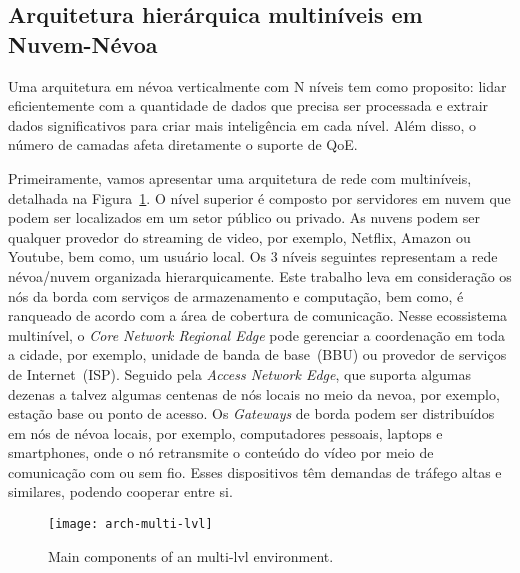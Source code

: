 \subsection{Arquitetura hierárquica multiníveis em Nuvem-Névoa}

Uma arquitetura em névoa verticalmente com N níveis tem como proposito: lidar eficientemente com a quantidade de dados que precisa ser processada e extrair dados significativos para criar mais inteligência em cada nível. Além disso, o número de camadas afeta diretamente o suporte de QoE.

Primeiramente, vamos apresentar uma arquitetura de rede com multiníveis, detalhada na Figura~\ref{fig:arch-multi-lvl}. O nível superior é composto por servidores em nuvem que podem ser localizados em um setor público ou privado. As nuvens podem ser qualquer provedor do streaming de video, por exemplo, Netflix, Amazon ou Youtube, bem como, um usuário local. %
Os 3 níveis seguintes representam a rede névoa/nuvem organizada hierarquicamente. Este  trabalho leva em consideração os nós da borda com serviços de armazenamento e computação, bem como, é ranqueado de acordo com a área de cobertura de comunicação. Nesse ecossistema multinível, o \textit{Core Network Regional Edge} pode gerenciar a coordenação em toda a cidade, por exemplo, unidade de banda de base~(BBU) ou provedor de serviços de Internet~(ISP). Seguido pela \textit{Access Network Edge}, que suporta algumas dezenas a talvez algumas centenas de nós locais no meio da nevoa, por exemplo, estação base ou ponto de acesso. Os \textit{Gateways} de borda podem ser distribuídos em nós de névoa locais, por exemplo, computadores pessoais, laptops e smartphones, onde o nó retransmite o conteúdo do vídeo por meio de comunicação com ou sem fio. Esses dispositivos têm demandas de tráfego altas e similares, podendo cooperar entre si.%
\vspace{0.8cm}
\begin{figure}[htb]
  \centering
  \texttt{[image: arch-multi-lvl]}
  \caption{Main components of an multi-lvl environment.}
  \label{fig:arch-multi-lvl}
\end{figure}

